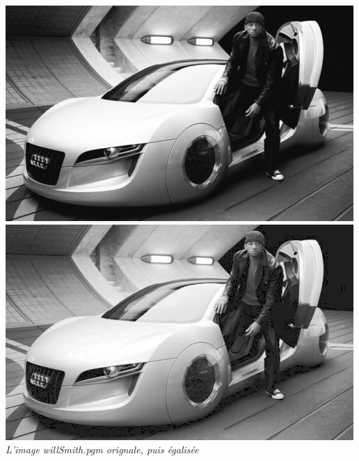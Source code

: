 \documentclass[a4paper,11pt]{article}
\begin{document}
\begin{center}
\includegraphics[scale=0.33]{will_pgm.png}
\includegraphics[scale=0.33]{willegal.png}\\
\textit{L'image willSmith.pgm orignale, puis égalisée}
\end{center}
\end{document}
